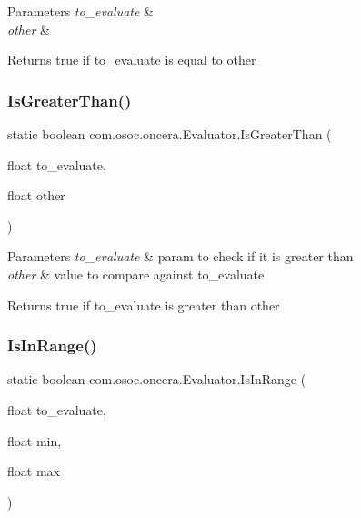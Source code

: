 \begin{DoxyParams}{Parameters}
{\em to\+\_\+evaluate} & \\
\hline
{\em other} & \\
\hline
\end{DoxyParams}
\begin{DoxyReturn}{Returns}
true if to\+\_\+evaluate is equal to other 
\end{DoxyReturn}
\mbox{\label{classcom_1_1osoc_1_1oncera_1_1_evaluator_a40a29338e8c3c2c158b28ddc7c89f75a}} 
\subsubsection{\texorpdfstring{IsGreaterThan()}{IsGreaterThan()}}
{\footnotesize\ttfamily static boolean com.\+osoc.\+oncera.\+Evaluator.\+Is\+Greater\+Than (\begin{DoxyParamCaption}\item[{float}]{to\+\_\+evaluate,  }\item[{float}]{other }\end{DoxyParamCaption})\hspace{0.3cm}{\ttfamily [static]}}


\begin{DoxyParams}{Parameters}
{\em to\+\_\+evaluate} & param to check if it is greater than \\
\hline
{\em other} & value to compare against to\+\_\+evaluate \\
\hline
\end{DoxyParams}
\begin{DoxyReturn}{Returns}
true if to\+\_\+evaluate is greater than other 
\end{DoxyReturn}
\mbox{\label{classcom_1_1osoc_1_1oncera_1_1_evaluator_acab172afa50918f5bc8fd61e1327a768}} 
\subsubsection{\texorpdfstring{IsInRange()}{IsInRange()}}
{\footnotesize\ttfamily static boolean com.\+osoc.\+oncera.\+Evaluator.\+Is\+In\+Range (\begin{DoxyParamCaption}\item[{float}]{to\+\_\+evaluate,  }\item[{float}]{min,  }\item[{float}]{max }\end{DoxyParamCaption})\hspace{0.3cm}{\ttfamily [static]}}

